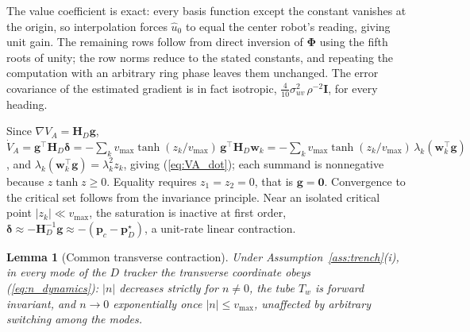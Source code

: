 \documentclass[lettersize,journal]{IEEEtran}
\newtheorem{lemma}{Lemma}
\begin{document}
\begin{IEEEproof}
The value coefficient is exact: every basis function except the constant
vanishes at the origin, so interpolation forces $\hat{u}_0$ to equal the
center robot's reading, giving unit gain. The remaining rows follow from
direct inversion of $\boldsymbol{\Phi}$ using the fifth roots of unity;
the row norms reduce to the stated constants, and repeating the
computation with an arbitrary ring phase leaves them unchanged. The
error covariance of the estimated gradient is in fact isotropic,
$\tfrac{4}{10}\sigma_{uv}^2\,\rho^{-2}\mathbf{I}$, for every heading.
\end{IEEEproof}

\begin{IEEEproof}
Since $\nabla V_A = \mathbf{H}_D \mathbf{g}$,
$\dot{V}_A = \mathbf{g}^\top \mathbf{H}_D \boldsymbol{\delta}
= -\sum_k v_{\max} \tanh(z_k/v_{\max})\,
\mathbf{g}^\top \mathbf{H}_D \mathbf{w}_k
= -\sum_k v_{\max} \tanh(z_k/v_{\max})\,\lambda_k
(\mathbf{w}_k^\top\mathbf{g})$, and $\lambda_k(\mathbf{w}_k^\top
\mathbf{g}) = \lambda_k^2 z_k$, giving (\ref{eq:VA_dot}); each summand
is nonnegative because $z\tanh z \geq 0$. Equality requires $z_1 = z_2 =
0$, that is $\mathbf{g} = \mathbf{0}$. Convergence to the critical set
follows from the invariance principle. Near an isolated critical point
$|z_k| \ll v_{\max}$, the saturation is inactive at first order,
$\boldsymbol{\delta} \approx -\mathbf{H}_D^{-1}\mathbf{g} \approx
-(\mathbf{p}_c - \mathbf{p}^\star_D)$, a unit-rate linear contraction.
\end{IEEEproof}

\begin{lemma}[Common transverse contraction]
\label{lem:transverse}
Under Assumption~\ref{ass:trench}(i), in every mode of the $D$ tracker
the transverse coordinate obeys (\ref{eq:n_dynamics}): $|n|$ decreases
strictly for $n \neq 0$, the tube $T_w$ is forward invariant, and
$n \to 0$ exponentially once $|n| \leq v_{\max}$, unaffected by
arbitrary switching among the modes.
\end{lemma}
\end{document}
